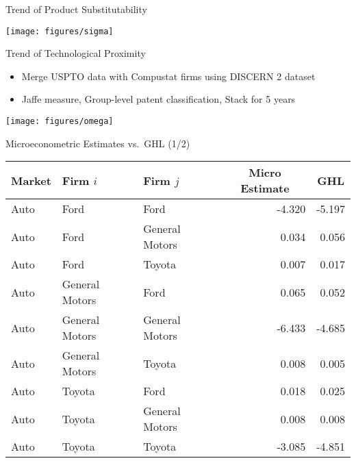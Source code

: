\documentclass[
  10pt,               %
  aspectratio=169,     %
]{beamer}
\theoremstyle{plain}
\begin{document}
\begin{frame}{Trend of Product Substitutability}
  \begin{center}
    \texttt{[image: figures/sigma]}
    \par\end{center}

\end{frame}

\begin{frame}{Trend of Technological Proximity}
  \begin{itemize}
    \item Merge USPTO data with Compustat firms using DISCERN 2 dataset \citep{Arora2024-ad}
    \item Jaffe measure, Group-level patent classification, Stack for 5 years
  \end{itemize}
  \begin{center}
    \texttt{[image: figures/omega]}
    \par\end{center}
\end{frame}

\begin{frame}[t]{Microeconometric Estimates vs.\ GHL \citep{Pellegrino2024-dn} (1/2)}
  \label{micro_vs_ghl}
  \begin{center}
    \begin{tabular}{lllrr}
      \toprule
      Market & Firm $i$       & Firm $j$       & \multicolumn{1}{c}{Micro Estimate} & \multicolumn{1}{c}{GHL} \\
      \midrule
      Auto   & Ford           & Ford           & -4.320                             & -5.197                  \\
      Auto   & Ford           & General Motors & 0.034                              & 0.056                   \\
      Auto   & Ford           & Toyota         & 0.007                              & 0.017                   \\
      Auto   & General Motors & Ford           & 0.065                              & 0.052                   \\
      Auto   & General Motors & General Motors & -6.433                             & -4.685                  \\
      Auto   & General Motors & Toyota         & 0.008                              & 0.005                   \\
      Auto   & Toyota         & Ford           & 0.018                              & 0.025                   \\
      Auto   & Toyota         & General Motors & 0.008                              & 0.008                   \\
      Auto   & Toyota         & Toyota         & -3.085                             & -4.851                  \\
      \bottomrule
    \end{tabular}
  \end{center}

  \hyperlink{product_identification}{}
\end{frame}
\end{document}
